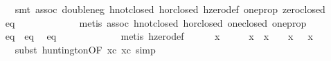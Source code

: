 \begin{isabellebody}
\ \ \ \ \ \ \isamarkupfalse%
\ {}smt\ assoc\ double{}neg\ hnot{}closed\ hor{}closed\ hzero{}def\ one{}prop\ zero{}closed{}\isanewline
\isanewline
\ \ \ \ \isamarkupfalse%
\ eq{}{}\ {}{}\ {}\ {}\ {}\ {}{}\isanewline
\ \ \ \ \ \ \isamarkupfalse%
\ {}metis\ assoc\ hnot{}closed\ hor{}closed\ one{}closed\ one{}prop{}\isanewline
\isanewline
\ \ \ \ \isamarkupfalse%
\ eq{}\ \ eq{}\ \isamarkupfalse%
\ eq{}{}\ {}{}\ {}\ {}\ {}\ {}{}\isanewline
\ \ \ \ \ \ \isamarkupfalse%
\ {}metis\ hzero{}def{}\isanewline
\isanewline
\ \ \ \ \isamarkupfalse%
\ {}x\ {}\ {}\ {}\ {}\ {}{}\ x\ {}\ x{}\ {}\ {}\ {}{}\ x\ {}\ {}\ x{}\ {}\ {}{}\isanewline
\ \ \ \ \ \ \isamarkupfalse%
\ {}subst\ huntington{}OF\ xc\ xc{}{}\ simp{}\isanewline

\end{isabellebody}
